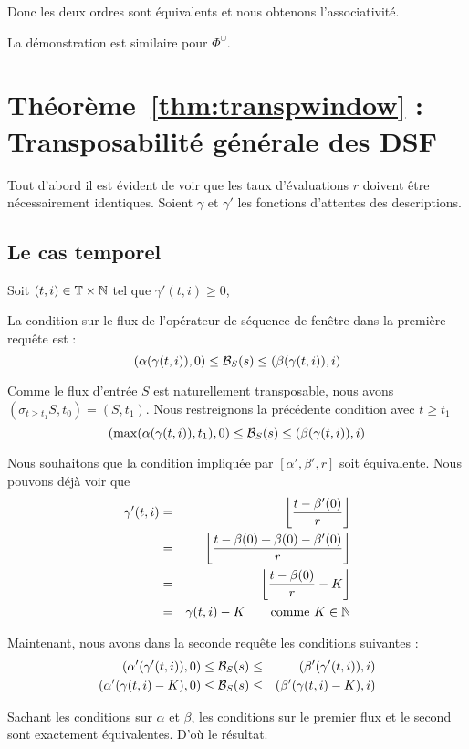 Donc les deux ordres sont équivalents et nous obtenons l'associativité.

La démonstration est similaire pour $\Phi^\cup$.

\section{Théorème~\ref{thm:transpwindow} : Transposabilité générale des DSF}
Tout d'abord il est évident de voir que les taux d'évaluations $r$ doivent être nécessairement identiques. Soient $\gamma$ et $\gamma'$ les fonctions d'attentes des descriptions.
\subsection{Le cas temporel}
Soit $(t,i)\in \mathbb{T}\times\mathbb{N}$ tel que $\gamma'(t,i)\geq 0$,

La condition sur le flux de l'opérateur de séquence de fenêtre dans la première requête est :
$$(\alpha(\gamma(t,i)),0) \leq \mathcal{B}_S(s) \leq (\beta(\gamma(t,i)),i)$$

Comme le flux d'entrée $S$ est naturellement transposable, nous avons $(\sigma_{t\geq t_1} S,t_0) = (S,t_1)$. Nous restreignons la précédente condition avec $t\geq t_1$
$$(\max(\alpha(\gamma(t,i)),t_1),0) \leq \mathcal{B}_S(s) \leq (\beta(\gamma(t,i)),i)$$

Nous souhaitons que la condition impliquée par $[\alpha',\beta',r]$ soit équivalente. Nous pouvons déjà voir que 
\begin{eqnarray*}
\gamma'(t,i) &=& \left\lfloor\frac{t-\beta'(0)}{r}\right\rfloor \\
& = & \left\lfloor\frac{t-\beta(0)+\beta(0)-\beta'(0)}{r}\right\rfloor\\
& = & \left\lfloor\frac{t-\beta(0)}{r} - K\right\rfloor\\
& = & \gamma(t,i) - K\qquad \textrm{comme\ } K \in \mathbb{N}
\end{eqnarray*}

Maintenant, nous avons dans la seconde requête les conditions suivantes :
\begin{eqnarray*}
(\alpha'(\gamma'(t,i)),0) & \leq \mathcal{B}_S(s) \leq & (\beta'(\gamma'(t,i)),i)\\
(\alpha'(\gamma(t,i)-K),0) & \leq \mathcal{B}_S(s) \leq & (\beta'(\gamma(t,i)-K),i)
\end{eqnarray*}

Sachant les conditions sur $\alpha$ et $\beta$, les conditions sur le premier flux et le second sont exactement équivalentes. D'où le résultat.
\findemo

